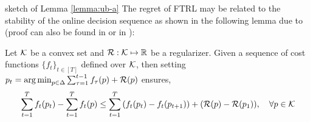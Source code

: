 \begin{proofarg}{sketch of Lemma  \ref{lemma:ub-a} } 
The regret of FTRL may be related to the stability of the online decision sequence as shown in
 the following lemma due to \cite{kalai2005efficient} (proof 
 can also be found in \cite{Hazan09}  or in \cite{shalev2012online}):
\begin{lemma} \label{Lemma:FTL-BTL}
Let $\mathcal{K}$ be a convex set and  $\mathcal{R}:\mathcal{K}\mapsto{\mathbb R}$ be a regularizer. Given a sequence of cost functions $\{f_t \}_{t\in[T]}$ defined over $\mathcal{K}$, then setting $p_t = \operatorname*{arg\,min}_{p\in\Delta}\sum_{\tau=1}^{t-1}f_{\tau}(p)+\mathcal{R}(p)$ 
ensures,
\begin{align*}
\sum_{t=1}^T f_t(p_t)-\sum_{t=1}^T f_t(p)\leq \sum_{t=1}^T\left( f_t(p_t) -f_t(p_{t+1}) \right) +(\mathcal{R}(p)-\mathcal{R}(p_1)), \quad \forall p\in\mathcal{K}
\end{align*}
\end{lemma}


\end{proofarg}
